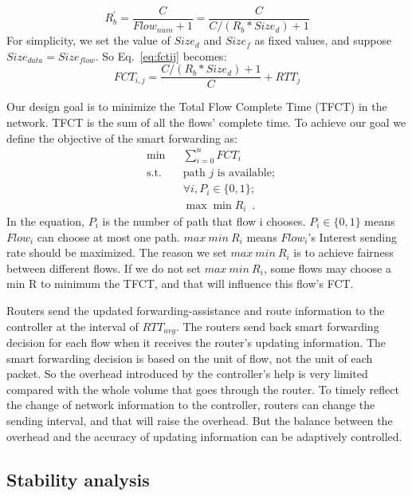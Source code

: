 \begin{equation}
R^{'}_{b}=\frac{C}{Flow_{num}+1} = \frac{C}{C/(R_{b}\ast{Size_{d}})+1}
\end{equation}
For simplicity, we set the value of $Size_{d}$ and $Size_{f}$ as fixed values, and suppose $Size_{data} =Size_{flow}$. So Eq.~\ref{eq:fctij} becomes:
\begin{equation}
FCT_{i,j}=\frac{C/(R_{b}*Size_{d})+1}{C}+RTT_j
\end{equation}

Our design goal is to minimize the Total Flow Complete Time (TFCT) in the network. TFCT is the sum of all the flows' complete time. To achieve our goal we define the objective of the smart forwarding as:
\begin{equation}
	\begin{aligned}
		& \min &&  \sum_{i=0}^{n} FCT_i \\
		& \text{s.t.}  && \text{path } j \text{ is available};\\
		&              && \forall i, P_i \in \{0,1\};\\
		&              && \max \min  R_i \enspace .
	\end{aligned}
\end{equation}
In the equation, $P_i$ is the number of path that flow i chooses. $P_i \in \{0,1\}$ means $Flow_i$ can choose at most one path. $max \ min \ R_i$ means $Flow_{i}$'s Interest sending rate should be maximized. The reason we set $max \ min \ R_i$ is to achieve fairness between different flows. If we do not set $max \ min \ R_i$, some flows may choose a min R to minimum the TFCT, and that will influence this flow's FCT.

Routers send the updated forwarding-assistance and route information to the controller at the interval of $RTT_{avg}$. The routers send back smart forwarding decision for each flow when it receives the router's updating information. The smart forwarding decision is based on the unit of flow, not the unit of each packet. So the overhead introduced by the controller's help is very limited compared with the whole volume that goes through the router. To timely reflect the change of network information to the controller, routers can change the sending interval, and that will raise the overhead. But the balance between the overhead and the accuracy of updating information can be adaptively controlled.

\subsection{Stability analysis}

